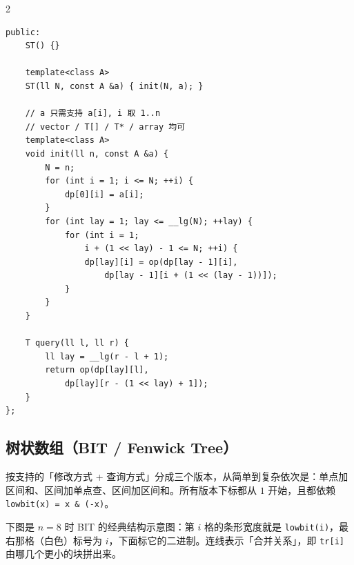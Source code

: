 \begin{multicols*}{2}
\begin{verbatim}
public:
	ST() {}

	template<class A>
	ST(ll N, const A &a) { init(N, a); }

	// a 只需支持 a[i], i 取 1..n
	// vector / T[] / T* / array 均可
	template<class A>
	void init(ll n, const A &a) {
		N = n;
		for (int i = 1; i <= N; ++i) {
			dp[0][i] = a[i];
		}
		for (int lay = 1; lay <= __lg(N); ++lay) {
			for (int i = 1;
				i + (1 << lay) - 1 <= N; ++i) {
				dp[lay][i] = op(dp[lay - 1][i],
					dp[lay - 1][i + (1 << (lay - 1))]);
			}
		}
	}

	T query(ll l, ll r) {
		ll lay = __lg(r - l + 1);
		return op(dp[lay][l],
			dp[lay][r - (1 << lay) + 1]);
	}
};
	\end{verbatim}

	\subsection{树状数组（BIT / Fenwick Tree）}

	按支持的「修改方式 + 查询方式」分成三个版本，从简单到复杂依次是：单点加区间和、区间加单点查、区间加区间和。所有版本下标都从 $1$ 开始，且都依赖 \verb|lowbit(x) = x & (-x)|。

	下图是 $n = 8$ 时 BIT 的经典结构示意图：第 $i$ 格的条形宽度就是 \verb|lowbit(i)|，最右那格（白色）标号为 $i$，下面标它的二进制。连线表示「合并关系」，即 \verb|tr[i]| 由哪几个更小的块拼出来。

	\begin{center}
\end{center}
\end{multicols*}
